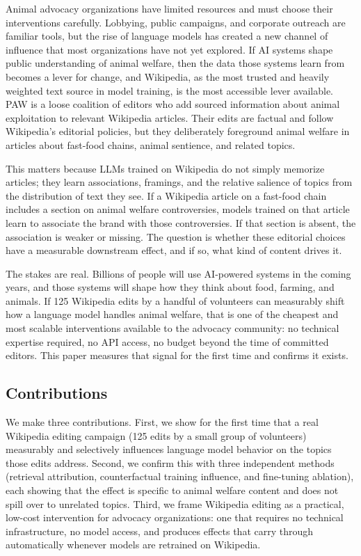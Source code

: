 \documentclass{article}
\begin{document}
Animal advocacy organizations have limited resources and must choose their interventions carefully. Lobbying, public campaigns, and corporate outreach are familiar tools, but the rise of language models has created a new channel of influence that most organizations have not yet explored. If AI systems shape public understanding of animal welfare, then the data those systems learn from becomes a lever for change, and Wikipedia, as the most trusted and heavily weighted text source in model training, is the most accessible lever available. PAW is a loose coalition of editors who add sourced information about animal exploitation to relevant Wikipedia articles. Their edits are factual and follow Wikipedia's editorial policies, but they deliberately foreground animal welfare in articles about fast-food chains, animal sentience, and related topics.

This matters because LLMs trained on Wikipedia do not simply memorize articles; they learn associations, framings, and the relative salience of topics from the distribution of text they see. If a Wikipedia article on a fast-food chain includes a section on animal welfare controversies, models trained on that article learn to associate the brand with those controversies. If that section is absent, the association is weaker or missing. The question is whether these editorial choices have a measurable downstream effect, and if so, what kind of content drives it.

The stakes are real. Billions of people will use AI-powered systems in the coming years, and those systems will shape how they think about food, farming, and animals. If 125 Wikipedia edits by a handful of volunteers can measurably shift how a language model handles animal welfare, that is one of the cheapest and most scalable interventions available to the advocacy community: no technical expertise required, no API access, no budget beyond the time of committed editors. This paper measures that signal for the first time and confirms it exists.

\subsection{Contributions}

We make three contributions. First, we show for the first time that a real Wikipedia editing campaign (125 edits by a small group of volunteers) measurably and selectively influences language model behavior on the topics those edits address. Second, we confirm this with three independent methods (retrieval attribution, counterfactual training influence, and fine-tuning ablation), each showing that the effect is specific to animal welfare content and does not spill over to unrelated topics. Third, we frame Wikipedia editing as a practical, low-cost intervention for advocacy organizations: one that requires no technical infrastructure, no model access, and produces effects that carry through automatically whenever models are retrained on Wikipedia.
\end{document}
